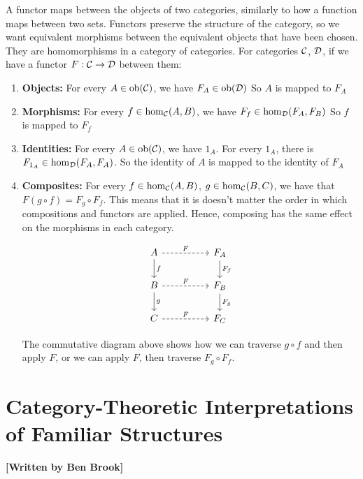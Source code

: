 \documentclass[10pt,a4paper,reqno]{amsart}
\numberwithin{figure}{section}
\begin{document}
A functor maps between the objects of two categories, similarly to how a function maps between two sets.
Functors preserve the structure of the category, so we want equivalent morphisms between the equivalent objects that have been chosen.
They are homomorphisms in a category of categories.
For categories $\mathcal{C}$, $\mathcal{D}$, if we have a functor $F: \mathcal{C}\to\mathcal{D}$ between them:
\begin{enumerate}
        \item \textbf{Objects:} For every $A\in\operatorname{ob}(\mathcal{C})$, we have $F_A\in\operatorname{ob}(\mathcal{D})$
        So $A$ is mapped to $F_A$

        \item \textbf{Morphisms:} For every $f\in\hom_{\mathcal{C}}(A,B)$, we have $F_f\in\hom_{\mathcal{D}}(F_A,F_B)$
        So $f$ is mapped to $F_f$

        \item \textbf{Identities:} For every $A\in\operatorname{ob}(\mathcal{C})$, we have $1_A$. For every $1_A$, there is $F_{1_A}\in\hom_{\mathcal{D}}(F_A,F_A)$.
        So the identity of $A$ is mapped to the identity of $F_A$

        \item \textbf{Composites:} For every $f\in\hom_{\mathcal{C}}(A,B)$, $g\in\hom_{\mathcal{C}}(B,C)$, we have that $F(g\circ f) = F_g\circ F_f$.
        This means that it is doesn't matter the order in which compositions and functors are applied.
        Hence, composing has the same effect on the morphisms in each category.

        \begin{equation}
        \begin{tikzcd}[column sep=huge]
                A \ar[r,"F",dashrightarrow] \ar[d,"f"] & F_A \ar[d,"F_f"]\\
                B \ar[r,"F",dashrightarrow] \ar[d,"g"] & F_B \ar[d,"F_g"]\\
                C \ar[r,"F",dashrightarrow] & F_C
        \end{tikzcd}
        \end{equation}

        The commutative diagram above shows how we can traverse $g\circ f$ and then apply $F$,
        or we can apply $F$, then traverse $F_g\circ F_f$.
\end{enumerate}

\section{Category-Theoretic %
        Interpretations of Familiar Structures}
\begin{flushright}
        \textbf{[Written by Ben Brook]}
\end{flushright}
\end{document}
